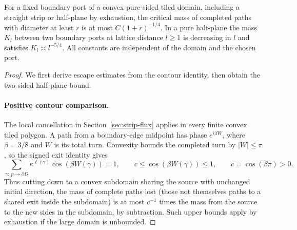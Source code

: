 \begin{proposition}\label{prop:crossings}
For a fixed boundary port of a convex pure-sided tiled domain, including a straight strip or half-plane by exhaustion, the critical mass of completed paths with diameter at least $r$ is at most $C(1+r)^{-1/4}$. In a pure half-plane the mass $K_l$ between two boundary ports at lattice distance $l\ge1$ is decreasing in $l$ and satisfies $K_l\asymp l^{-5/4}$. All constants are independent of the domain and the chosen port.
\end{proposition}
\begin{proof}
We first derive escape estimates from the contour identity, then obtain the two-sided half-plane bound.

\paragraph{Positive contour comparison.}
The local cancellation in Section~\ref{sec:strip-flux} applies in every finite convex tiled polygon. A path from a boundary-edge midpoint has phase \(e^{i\beta W}\), where \(\beta=3/8\) and \(W\) is its total turn. Convexity bounds the completed turn by \(|W|\le\pi\), so the signed exit identity gives
\[
 \sum_{\gamma:\,p\to\partial D}\kappa^{\ell(\gamma)}
       \cos(\beta W(\gamma))=1,
 \qquad c\le\cos(\beta W(\gamma))\le1,
 \qquad c=\cos(\beta\pi)>0.
\] Thus cutting down to a convex subdomain sharing the source with unchanged initial direction, the mass of complete paths lost (those not themselves paths to a shared exit inside the subdomain) is at most \(c^{-1}\) times the mass from the source to the new sides in the subdomain, by subtraction. Such upper bounds apply by exhaustion if the large domain is unbounded.


\end{proof}

